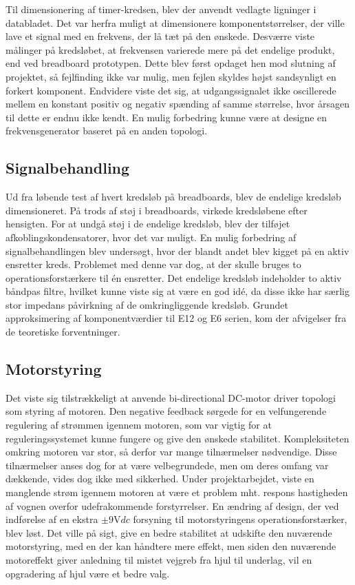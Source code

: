 Til dimensionering af timer-kredsen, blev der anvendt vedlagte ligninger i databladet.
Det var herfra muligt at dimensionere komponentstørrelser, der ville lave et signal med en frekvens, der lå tæt på den ønskede.
Desværre viste målinger på kredsløbet, at frekvensen varierede mere på det endelige produkt, end ved breadboard prototypen.
Dette blev først opdaget hen mod slutning af projektet, så fejlfinding ikke var mulig, men fejlen skyldes højst sandsynligt en forkert komponent.
Endvidere viste det sig, at udgangssignalet ikke oscillerede mellem en konstant positiv og negativ spænding af samme størrelse, hvor årsagen til dette er endnu ikke kendt.
En mulig forbedring kunne være at designe en frekvensgenerator baseret på en anden topologi.

\subsection{Signalbehandling}
Ud fra løbende test af hvert kredsløb på breadboards, blev de endelige kredsløb dimensioneret.
På trods af støj i breadboards, virkede kredsløbene efter hensigten.
For at undgå støj i de endelige kredsløb, blev der tilføjet afkoblingskondensatorer, hvor det var muligt.
En mulig forbedring af signalbehandlingen blev undersøgt, hvor der blandt andet blev kigget på en aktiv ensretter kreds. Problemet med denne var dog, at der skulle bruges to operationsforstærkere til én ensretter.
Det endelige kredsløb indeholder to aktiv båndpas filtre, hvilket kunne viste sig at være en god idé, da disse ikke har særlig stor impedans påvirkning af de omkringliggende kredsløb.
Grundet approksimering af komponentværdier til E12 og E6 serien, kom der afvigelser fra de teoretiske forventninger.

\subsection{Motorstyring}
Det viste sig tilstrækkeligt at anvende bi-directional DC-motor driver topologi som styring af motoren. 
Den negative feedback sørgede for en velfungerende regulering af strømmen igennem motoren, som var vigtig for at reguleringssystemet kunne fungere og give den ønskede stabilitet.
Kompleksiteten omkring motoren var stor, så derfor var mange tilnærmelser nødvendige.
Disse tilnærmelser anses dog for at være velbegrundede, men om deres omfang var dækkende, vides dog ikke med sikkerhed.
Under projektarbejdet, viste en manglende strøm igennem motoren at være et problem mht. respons hastigheden af vognen overfor udefrakommende forstyrrelser.     
En ændring af design, der ved indførelse af en ekstra $\pm 9 \si{\volt}dc$ forsyning til motorstyringens operationsforstærker, blev løst.
Det ville på sigt, give en bedre stabilitet at udskifte den nuværende motorstyring, med en der kan håndtere mere effekt, men siden den nuværende motoreffekt giver anledning til mistet vejgreb fra hjul til underlag, vil en opgradering af hjul være et bedre valg. 

